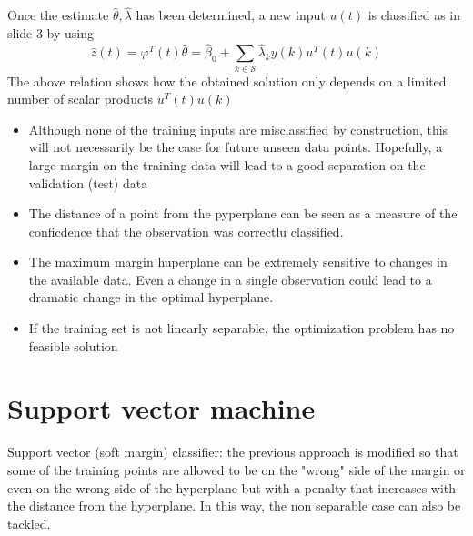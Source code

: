 \documentclass{book}
\begin{document}
Once the estimate $\hat{\theta},\hat{\lambda}$ has been determined, a new input $u(t)$ is classified as in slide 3 by using 
\[
    \hat{z}(t)=\varphi^T(t)\hat{\theta}=\hat{\beta}_0+\displaystyle\sum_{k\in\mathcal{S}}^{}\hat{\lambda}_ky(k)u^T(t)u(k)
\]
The above relation shows how the obtained solution only depends on a limited number of scalar products $u^T(t)u(k)$

\begin{itemize}
    \item Although none of the training inputs are misclassified by construction, this will not necessarily be the case for future unseen data points. Hopefully, a large margin on the training data will lead to a good separation on the validation (test) data
    \item The distance of a point from the pyperplane can be seen as a measure of the conficdence that the observation was correctlu classified. 
    \item The maximum margin huperplane can be extremely sensitive to changes in the available data. Even a change in a single observation could lead to a dramatic change in the optimal hyperplane. 
    \item If the training set is not linearly separable, the optimization problem has no feasible solution
\end{itemize}

\section{Support vector machine}
Support vector (soft margin) classifier: the previous approach is modified so that some of the training points are allowed to be on the "wrong" side of the margin or even on the wrong side of the hyperplane but with a penalty that increases with the distance from the hyperplane. In this way, the non separable case can also be tackled. 
\end{document}
